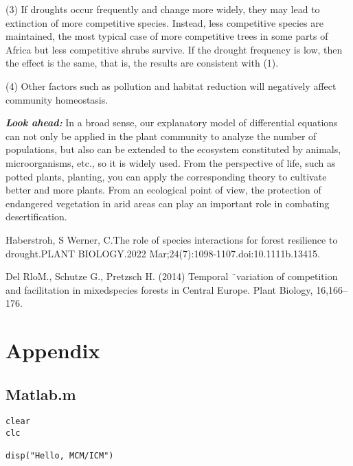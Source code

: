 \documentclass[12pt]{article}
\begin{document}
(3) If droughts occur frequently and change more widely, they may lead to extinction of more competitive species. Instead, less competitive species are maintained, the most typical case of more competitive trees in some parts of Africa but less competitive shrubs survive. If the drought frequency is low, then the effect is the same, that is, the results are consistent with (1).

(4) Other factors such as pollution and habitat reduction will negatively affect community homeostasis.

{\it\textbf{Look ahead:}} In a broad sense, our explanatory model of differential equations can not only be applied in the plant community to analyze the number of populations, but also can be extended to the ecosystem constituted by animals, microorganisms, etc., so it is widely used. From the perspective of life, such as potted plants, planting, you can apply the corresponding theory to cultivate better and more plants. From an ecological point of view, the protection of endangered vegetation in arid areas can play an important role in combating desertification.





\begin{thebibliography}{10}
	 Haberstroh, S Werner, C.The role of species interactions for forest resilience to drought.PLANT BIOLOGY.2022 Mar;24(7):1098-1107.doi:10.1111b.13415.

     Del RloM., Schutze G., Pretzsch H. (2014) Temporal ¨variation of competition and facilitation in mixedspecies forests in Central Europe. Plant Biology, 16,166–176.
\end{thebibliography}


\section*{Appendix}
\subsection*{Matlab.m}


\begin{lstlisting}
clear
clc

disp("Hello, MCM/ICM")
\end{lstlisting}
\end{document}
